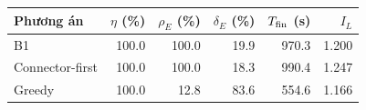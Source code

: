 \begin{tabular}{lrrrrr}
\toprule
Phương án & $\eta$ (\%) & $\rho_E$ (\%) & $\delta_E$ (\%) & $T_{\rm fin}$ (s) & $I_L$ \\
\midrule
B1 & 100.0 & 100.0 & 19.9 & 970.3 & 1.200 \\
Connector-first & 100.0 & 100.0 & 18.3 & 990.4 & 1.247 \\
Greedy & 100.0 & 12.8 & 83.6 & 554.6 & 1.166 \\
\bottomrule
\end{tabular}
